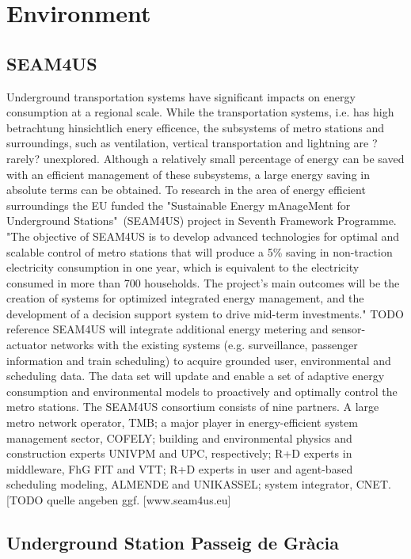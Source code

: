 \section{Environment}
\label{sec:environment}

\subsection{SEAM4US}
\label{subsec:seam4us}

Underground transportation systems have significant impacts on energy consumption at a regional scale. While the transportation systems, i.e. has high betrachtung hinsichtlich enery efficence, the subsystems of metro stations and surroundings, such as ventilation, vertical transportation and lightning are ?rarely? unexplored. Although a relatively small percentage of energy can be saved with an efficient management of these subsystems, a large energy saving in absolute terms can be obtained.
To research in the area of energy efficient surroundings the EU funded the "Sustainable Energy mAnageMent for Underground Stations"~(SEAM4US) project in Seventh Framework Programme.
"The objective of SEAM4US is to develop advanced technologies for optimal and scalable control of metro stations that will produce a 5\% saving in non-traction electricity consumption in one year, which is equivalent to the electricity consumed in more than 700 households. The project’s main outcomes will be the creation of systems for optimized integrated energy management, and the development of a decision support system to drive mid-term investments." TODO reference
SEAM4US will integrate additional energy metering and sensor-actuator networks with the existing systems (e.g. surveillance, passenger information and train scheduling)  to acquire grounded user, environmental and scheduling data. The data set will update and enable a set of adaptive energy consumption and environmental models to proactively and optimally control the metro stations.
The SEAM4US consortium consists of nine partners. A large metro network operator, TMB; a major player in energy-efficient system management sector, COFELY; building and environmental physics and construction experts UNIVPM and UPC, respectively; R+D experts in middleware, FhG FIT and VTT; R+D experts in user and agent-based scheduling modeling, ALMENDE and UNIKASSEL; system integrator, CNET. [TODO quelle angeben ggf. [www.seam4us.eu]


\subsection{Underground Station Passeig de Gr\`{a}cia}
\label{subsec:station}

